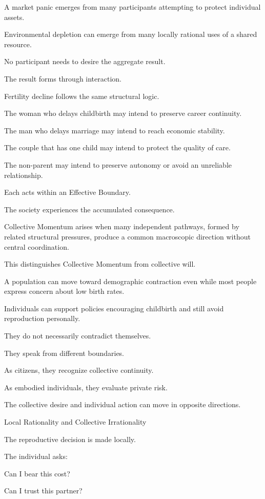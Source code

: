 A market panic emerges from many participants attempting to protect individual assets.

Environmental depletion can emerge from many locally rational uses of a shared resource.

No participant needs to desire the aggregate result.

The result forms through interaction.

Fertility decline follows the same structural logic.

The woman who delays childbirth may intend to preserve career continuity.

The man who delays marriage may intend to reach economic stability.

The couple that has one child may intend to protect the quality of care.

The non-parent may intend to preserve autonomy or avoid an unreliable relationship.

Each acts within an Effective Boundary.

The society experiences the accumulated consequence.

Collective Momentum arises when many independent pathways, formed by related structural pressures, produce a common macroscopic direction without central coordination.

This distinguishes Collective Momentum from collective will.

A population can move toward demographic contraction even while most people express concern about low birth rates.

Individuals can support policies encouraging childbirth and still avoid reproduction personally.

They do not necessarily contradict themselves.

They speak from different boundaries.

As citizens, they recognize collective continuity.

As embodied individuals, they evaluate private risk.

The collective desire and individual action can move in opposite directions.

Local Rationality and Collective Irrationality

The reproductive decision is made locally.

The individual asks:

Can I bear this cost?

Can I trust this partner?

